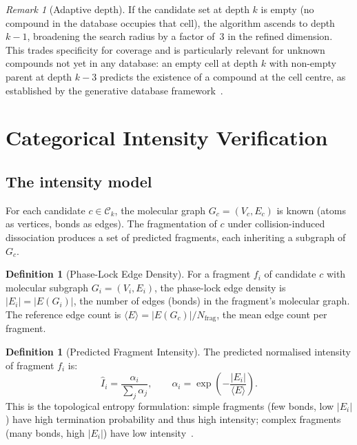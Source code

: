 \documentclass[twocolumn,10pt,a4paper]{article}
\theoremstyle{thmstyle}
\theoremstyle{definition}
\newtheorem{definition}[theorem]{Definition}
\theoremstyle{remark}
\newtheorem{remark}[theorem]{Remark}
\newcommand{\calC}{\mathcal{C}}
\begin{document}
\begin{remark}[Adaptive depth]
\label{rem:adaptive}
If the candidate set at depth $k$ is empty (no compound in the
database occupies that cell), the algorithm ascends to depth $k-1$,
broadening the search radius by a factor of~3 in the refined
dimension. This trades specificity for coverage and is particularly
relevant for unknown compounds not yet in any database: an empty cell
at depth $k$ with non-empty parent at depth $k-3$ predicts the
existence of a compound at the cell centre, as established by
the generative database framework~\citep{sachikonye2024generative}.
\end{remark}


\section{Categorical Intensity Verification}
\label{sec:intensity}

\subsection{The intensity model}

For each candidate $c \in \calC_k$, the molecular graph
$G_c = (V_c, E_c)$ is known (atoms as vertices, bonds as edges). The
fragmentation of $c$ under collision-induced dissociation produces a
set of predicted fragments, each inheriting a subgraph of $G_c$.

\begin{definition}[Phase-Lock Edge Density]
\label{def:edge-density}
For a fragment $f_i$ of candidate $c$ with molecular subgraph
$G_i = (V_i, E_i)$, the phase-lock edge density is
$|E_i| = |E(G_i)|$, the number of edges (bonds) in the fragment's
molecular graph. The reference edge count is
$\langle E \rangle = |E(G_c)|/N_{\mathrm{frag}}$, the mean edge count
per fragment.
\end{definition}

\begin{definition}[Predicted Fragment Intensity]
\label{def:predicted-intensity}
The predicted normalised intensity of fragment $f_i$ is:
\begin{equation}
\hat{I}_i = \frac{\alpha_i}{\sum_j \alpha_j},
\qquad
\alpha_i = \exp\!\left(-\frac{|E_i|}{\langle E \rangle}\right).
\label{eq:intensity}
\end{equation}
This is the topological entropy formulation: simple fragments (few
bonds, low $|E_i|$) have high termination probability and thus high
intensity; complex fragments (many bonds, high $|E_i|$) have low
intensity~\citep{sachikonye2024categorical}.
\end{definition}
\end{document}
